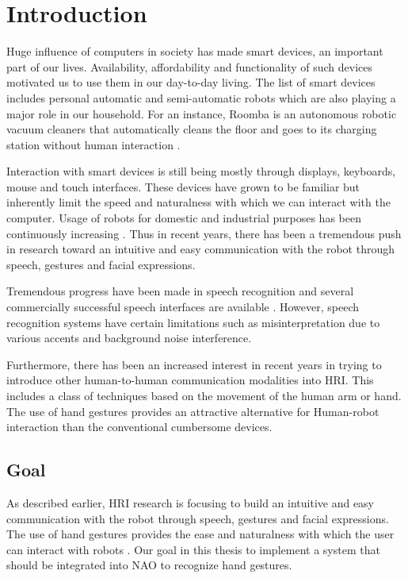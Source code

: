 \chapter{Introduction} Huge influence of computers in society has made smart devices, an important part of our lives. Availability, affordability and functionality of such devices motivated us to use them in our day-to-day living. The list of smart devices includes personal automatic and semi-automatic robots which are also playing a major role in our household. For an instance, Roomba is an autonomous robotic vacuum cleaners that automatically cleans the floor and goes to its charging station without human interaction \cite{4}.

Interaction with smart devices is still being mostly through displays, keyboards, mouse and touch interfaces. These devices have grown to be familiar but inherently limit the speed and naturalness with which we can interact with the computer. Usage of robots for domestic and industrial purposes has been continuously increasing \cite{5}. Thus in recent years, there has been a tremendous push in research toward an intuitive and easy communication with the robot through speech, gestures and facial expressions.

Tremendous progress have been made in speech recognition and several commercially successful speech interfaces are available \cite{6}. However, speech recognition systems have certain limitations such as misinterpretation due to various accents and background noise interference.

Furthermore, there has been an increased interest in recent years in trying to introduce other human-to-human communication modalities into HRI. This includes a class of techniques based on the movement of the human arm or hand. The use of hand gestures provides an attractive alternative for Human-robot interaction than the conventional cumbersome devices.


\section{Goal} As described earlier, HRI research is focusing to build an intuitive and easy communication with the robot through speech, gestures and facial expressions. The use of hand gestures provides the ease and naturalness with which the user can interact with robots \cite{1}. Our goal in this thesis to implement a system that should be integrated into NAO to recognize hand gestures. 

